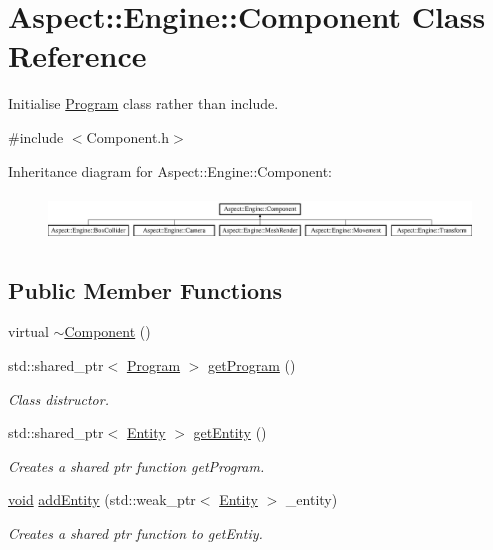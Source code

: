 \hypertarget{class_aspect_1_1_engine_1_1_component}{}\section{Aspect\+:\+:Engine\+:\+:Component Class Reference}
\label{class_aspect_1_1_engine_1_1_component}


Initialise \mbox{\hyperlink{class_aspect_1_1_engine_1_1_program}{Program}} class rather than include.  




{\ttfamily \#include $<$Component.\+h$>$}

Inheritance diagram for Aspect\+:\+:Engine\+:\+:Component\+:\begin{figure}[H]
\begin{center}
\leavevmode
\includegraphics[height=1.230769cm]{class_aspect_1_1_engine_1_1_component}
\end{center}
\end{figure}
\subsection*{Public Member Functions}
\begin{DoxyCompactItemize}
\item 
virtual \mbox{\hyperlink{class_aspect_1_1_engine_1_1_component_a8ceb47c002468c4ad876b7220da579f8}{$\sim$\+Component}} ()
\item 
std\+::shared\+\_\+ptr$<$ \mbox{\hyperlink{class_aspect_1_1_engine_1_1_program}{Program}} $>$ \mbox{\hyperlink{class_aspect_1_1_engine_1_1_component_a96e352a6d49b6e108572c0c19088aa52}{get\+Program}} ()
\begin{DoxyCompactList}\small\item\em Class distructor. \end{DoxyCompactList}\item 
std\+::shared\+\_\+ptr$<$ \mbox{\hyperlink{class_aspect_1_1_engine_1_1_entity}{Entity}} $>$ \mbox{\hyperlink{class_aspect_1_1_engine_1_1_component_a1422571aabd1882f712e16ef4bf0cb77}{get\+Entity}} ()
\begin{DoxyCompactList}\small\item\em Creates a shared ptr function get\+Program. \end{DoxyCompactList}\item 
\mbox{\hyperlink{_s_d_l__opengles2__gl2ext_8h_ae5d8fa23ad07c48bb609509eae494c95}{void}} \mbox{\hyperlink{class_aspect_1_1_engine_1_1_component_accb4c932c2e93369ca168e1cd204ee31}{add\+Entity}} (std\+::weak\+\_\+ptr$<$ \mbox{\hyperlink{class_aspect_1_1_engine_1_1_entity}{Entity}} $>$ \+\_\+entity)
\begin{DoxyCompactList}\small\item\em Creates a shared ptr function to get\+Entiy. \end{DoxyCompactList}\end{DoxyCompactItemize}
